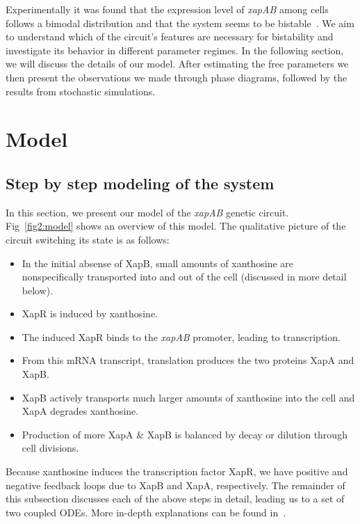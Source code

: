 \documentclass[10pt,letterpaper]{article}
\begin{document}
Experimentally it was found that the expression level of \emph{xapAB} among
cells follows a bimodal distribution and that the system seems to be
bistable~\cite{Chure2019}. We aim to understand which of the circuit's
features are necessary for bistability and investigate its behavior in
different parameter regimes. In the following section, we will discuss the
details of our model. After estimating the free parameters we then present
the observations we made through phase diagrams, followed by the results
from stochastic simulations.


\section*{Model}
\subsection*{Step by step modeling of the system}
In this section, we present our model of the \emph{xapAB} genetic circuit.
Fig~\ref{fig2:model} shows an overview of this model.
The qualitative picture of the circuit switching its state is as follows:
\begin{itemize}
	\item In the initial absense of XapB, small amounts of xanthosine are
		nonspecifically transported into and out of the cell (discussed in more detail below).
	\item XapR is induced by xanthosine.
	\item The induced XapR binds to the \emph{xapAB} promoter, leading to transcription.
	\item From this mRNA transcript, translation produces the two proteins XapA and XapB.
	\item XapB actively transports much larger amounts of xanthosine into the cell and XapA degrades xanthosine.
	\item Production of more XapA \& XapB is balanced by decay or dilution through cell divisions.
\end{itemize}
Because xanthosine induces the transcription factor XapR, we have positive
and negative feedback loops due to XapB and XapA, respectively. The remainder
of this subsection discusses each of the above steps in detail, leading us
to a set of two coupled ODEs. More in-depth explanations can be found
in~.
\end{document}
